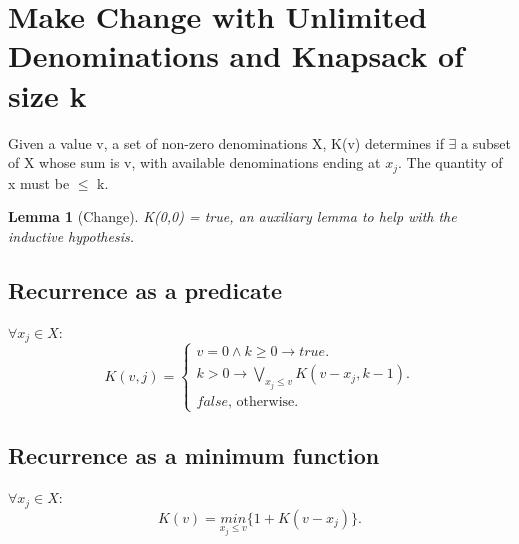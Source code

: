 \documentclass{article}
\newtheorem{lemma}[theorem]{Lemma}
\begin{document}
	
\section{Make Change with Unlimited Denominations and Knapsack of size k}
Given a value v, a set of non-zero denominations X, K(v) determines if $\exists$ a subset of X whose sum is v, with available denominations ending at $x_j$. The quantity of x must be $\leq$ k.

\begin{lemma} [Change]
\label{bc1}	
K(0,0) = true, an auxiliary lemma to help with the inductive hypothesis.
\end{lemma}

\subsection{Recurrence as a predicate}
$\forall x_j \in X$:\\
\begin{equation}
K(v,j)=			
\begin{cases}
v = 0 \land k \geq 0 \to true.\\	
k>0 \to \underset{x_j \leq v}{\bigvee} K(v-x_j, k-1).\\
false \text{, otherwise.}
\end{cases}
\end{equation}

\subsection{Recurrence as a minimum function}
$\forall x_j \in X$:\\
\begin{equation}
K(v)=			
\underset{x_j \leq v}{min} \{1+K(v-x_j)\}.
\end{equation}
\end{document}
